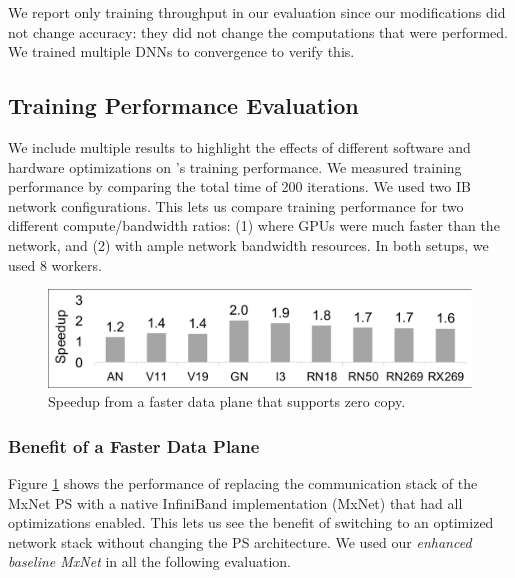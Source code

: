 We report only training throughput in our evaluation since our modifications did not change accuracy: they did not change the computations that were performed. We trained multiple DNNs to convergence to verify this.



\subsection{Training Performance Evaluation}
We include multiple results to highlight the effects of different software and hardware optimizations on \phub{}'s training performance. We measured training performance by comparing the total time of 200 iterations. We used two IB network configurations. This lets us compare training performance for two different compute/bandwidth ratios: (1) where GPUs were much faster than the network, and (2) with ample network bandwidth resources. In both setups, we used 8 workers.

\begin{figure}[t!]
    \centering
	\includegraphics[width=.7\linewidth,trim=8 4 4 4,clip]{Figures/IBBenefits.pdf}
	\caption{Speedup from a faster data plane that supports zero copy.}
	\label{fig:IBBenefits}
\end{figure}

\subsubsection{Benefit of a Faster Data Plane}
Figure \ref{fig:IBBenefits} shows the performance of replacing the communication stack of the MxNet PS with a native InfiniBand implementation (MxNet) that had all optimizations enabled. This lets us see the benefit of switching to an optimized network stack without changing the PS architecture. %
We used our \textit{enhanced baseline MxNet} in all the following evaluation.

